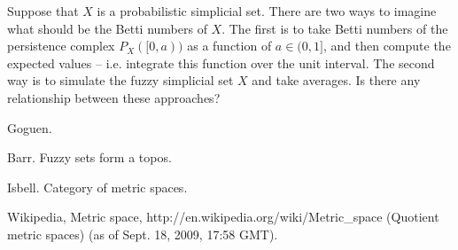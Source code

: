 \documentclass{amsart}
\begin{document}
\begin{question}

Suppose that $X$ is a probabilistic simplicial set.  There are two ways to imagine what should be the Betti numbers of $X$.  The first is to take Betti numbers of the persistence complex $P_X([0,a))$ as a function of $a\in (0,1]$, and then compute the expected values -- i.e. integrate this function over the unit interval.  The second way is to simulate the fuzzy simplicial set $X$ and take averages.  Is there any relationship between these approaches?

\end{question}



\begin{thebibliography}{JTT}

Goguen.

Barr. Fuzzy sets form a topos.

Isbell.  Category of metric spaces.

Wikipedia, Metric space, http://en.wikipedia.org/wiki/Metric\_space (Quotient metric spaces) (as of Sept. 18, 2009, 17:58 GMT).

\end{thebibliography}
\end{document}
